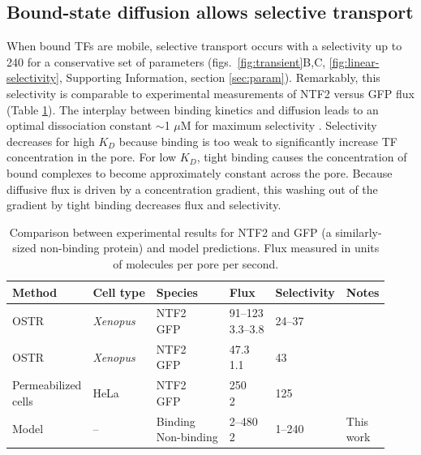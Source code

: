 \subsection{Bound-state diffusion allows selective transport}
When bound TFs are mobile, selective transport occurs with a
selectivity up to 240 for a conservative set of parameters
(figs.~\ref{fig:transient}B,C, \ref{fig:linear-selectivity},
Supporting Information, section \ref{sec:param}).  Remarkably, this
selectivity is comparable to experimental measurements of NTF2 versus
GFP flux (Table \ref{table:NTF2-flux}).  The interplay between binding
kinetics and diffusion leads to an optimal dissociation constant
$\sim$1 $\mu$M for maximum selectivity .
Selectivity decreases for high $K_D$ because binding is too weak to
significantly increase TF concentration in the pore.  For low $K_D$,
tight binding causes the concentration of bound complexes to become
approximately constant across the pore. Because diffusive flux is
driven by a concentration gradient, this washing out of the gradient
by tight binding decreases flux and selectivity.

\begin{table}[b!]
  \caption{Comparison between experimental results for NTF2 and GFP
    (a similarly-sized non-binding protein) and model
    predictions. Flux measured in units of molecules per pore per
    second.}
    \label{table:NTF2-flux}
    \begin{tabular}{p{2.1cm}p{1.2cm}p{1.7cm}p{0.9cm}p{1.6cm}p{0.8cm}}
      Method & Cell type & Species & Flux & Selectivity & Notes\\
      \hline
      OSTR & \textit{Xenopus} & \makecell[cl]{NTF2\\GFP} & \makecell[cl]{91--123\\3.3--3.8} & 24--37 
                         &\cite{siebrasse02}
      \\
      OSTR & \textit{Xenopus} & \makecell[cl]{NTF2\\GFP} & \makecell[cl]{47.3\\1.1} & 43 &  \cite{kiskin03}\\
      \makecell[cl]{Permeabilized \\ cells}  & HeLa &
                                                    \makecell[cl]{NTF2\\GFP} & \makecell[cl]{250\\2} & 125 & \cite{ribbeck01}\\
      Model & -- & \makecell[cl]{Binding\\Non-binding} & \makecell[cl]{2--480\\2} & 1--240 & \makecell[cl]{This\\work}\\
    \end{tabular}
\end{table}

